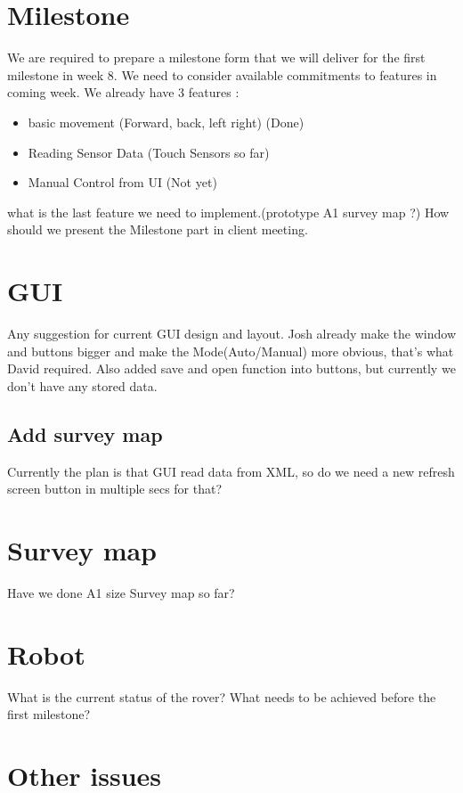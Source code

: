 \documentclass[11pt, a4paper]{article}
\begin{document}
   \section{Milestone}
   We are required to prepare a milestone form that we will deliver for the first milestone in week 8. We need to consider available commitments to features in coming week.\newline
   We already have 3 features :\newline
   \begin{itemize}
   \item  basic movement (Forward, back, left right) (Done)
   \item  Reading Sensor Data (Touch Sensors so far)
   \item  Manual Control from UI (Not yet)
     \end{itemize} 
   what is the last feature we need to implement.(prototype A1 survey map ?)
   How should  we present the Milestone part in client meeting.
   
   \section{GUI}
   Any suggestion for current GUI design and layout.
   Josh already make the window and buttons bigger and make the Mode(Auto/Manual) more obvious, that's what David required. Also added save and open function into buttons, but currently we don't have any stored data.
   
   \subsection{Add survey map}
   Currently the plan is that GUI read data from XML, so do we need a new refresh screen button in multiple secs for that?
   
   \section{Survey map}
   Have we done A1 size Survey map so far?
   
   \section{Robot}
   What is the current status of the rover? What needs to be achieved before the first milestone?
   
  \section{Other issues}
  
\end{document}

